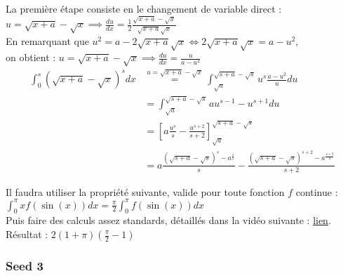 \documentclass[11.5pt,french,table]{article}
\theoremstyle{exercice}
\newenvironment{packed_enum}{
\begin{enumerate}
  \setlength{\itemsep}{11pt}
  \setlength{\parskip}{0pt}
  \setlength{\parsep}{0pt}
}{\end{enumerate}}
\begin{document}
\begin{packed_enum}
    \item La première étape consiste en le changement de variable direct :\\
    $
    u = \sqrt{x+a}-\sqrt{x} \implies \frac{du}{dx} = \frac{1}{2}\frac{\sqrt{x+a}-\sqrt{x}}{\sqrt{x+a}\sqrt{x}}
    $\\
    En remarquant que $u^2 = a - 2\sqrt{x+a}\sqrt{x}\iff 2\sqrt{x+a}\sqrt{x} = a - u^2$, \\on obtient :
    $
    u = \sqrt{x+a}-\sqrt{x} \implies \frac{du}{dx} = \frac{u}{a-u^2}
    $
    \begin{align*}
        \int_0^s (\sqrt{x+a} - \sqrt{x})^s dx &\overset{u = \sqrt{x+a}-\sqrt{x}}{=} \int_\sqrt{a}^{\sqrt{s+a}-\sqrt{s}} u^s \frac{a-u^2}{u}du \\ 
        &= \int_\sqrt{a}^{\sqrt{s+a}-\sqrt{s}} au^{s-1} - u^{s+1}du\\ 
        &= \left[a\frac{u^s}{s} - \frac{u^{s+2}}{s+2}\right]_\sqrt{a}^{\sqrt{s+a}-\sqrt{s}}\\ 
        &= a\frac{(\sqrt{s+a}-\sqrt{s})^s - a^{\frac{s}{2}}}{s} - \frac{(\sqrt{s+a}-\sqrt{s})^{s+2} - a^\frac{s+2}{2}}{s+2}
    \end{align*}
    
    \item Il faudra utiliser la propriété suivante, valide pour toute fonction $f$ continue :\\
    $
    \int_0^\pi xf(\sin(x))dx = \frac{\pi}{2}\int_0^\pi f(\sin(x))dx
    $\\
    Puis faire des calculs assez standards, détaillés dans la vidéo suivante : \underline{\href{https://www.youtube.com/watch?v=ExtlUgIxTNY}{lien}}. \\
    Résultat :
    $
    2(1+\pi)\left(\frac{\pi}{2}-1\right)
    $
\end{packed_enum}


\subsubsection{Seed 3}
\end{document}
